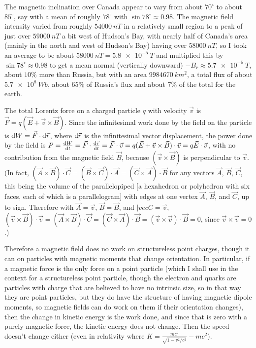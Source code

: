 The magnetic inclination over Canada appear to vary from about $70^\circ$ to about $85^\circ$, say with a mean of roughly $78^\circ$ with $\sin78^\circ \approx 0.98$. The magnetic field intensity varied from roughly $\SI{54000}{nT}$ in a relatively small region to a peak of just over $\SI{59000}{nT}$ a bit west of Hudson's Bay, with nearly half of Canada's area (mainly in the north and west of Hudson's Bay) having over $\SI{58000}{nT}$, so I took an average to be about $\SI{58000}{nT} = \SI{5.8e-5}{T}$ and multiplied this by $\sin78^\circ \approx 0.98$ to get a mean normal (vertically downward) $-B_r \approx \SI{5.7e-5}{T}$, about $10\%$ more than Russia, but with an area $\SI{9984670}{km^2}$, a total flux of about $\SI{5.7e8}{Wb}$, about $65\%$ of Russia's flux and about $7\%$ of the total for the earth.

The total Lorentz force on a charged particle $q$ with velocity $\vec{v}$ is $\vec{F} = q(\vec{E} + \vec{v}\times\vec{B})$. Since the infinitesimal work done by the field on the particle is $\operatorname{d\!} W = \vec{F}\cdot \operatorname{d\!} \vec{r}$, where $\operatorname{d\!} \vec{r}$ is the infinitesimal vector displacement, the power done by the field is $P = \frac{\operatorname{d\!} W}{\operatorname{d\!} t} = \vec{F}\cdot \frac{\operatorname{d\!} \vec{r}}{\operatorname{d\!} t} = \vec{F}\cdot \vec{v} = q(\vec{E} + \vec{v}\times\vec{B}) \cdot \vec{v} = q\vec{E}\cdot\vec{v}$, with no contribution from the magnetic field $\vec{B}$, because $(\vec{v} \times \vec{B})$ is perpendicular to $\vec{v}$. (In fact, $(\vec{A}\times\vec{B})\cdot\vec{C} = (\vec{B}\times\vec{C})\cdot\vec{A} = (\vec{C}\times\vec{A})\cdot\vec{B}$ for any vectors $\vec{A}$, $\vec{B}$, $\vec{C}$, this being the volume of the parallelopiped [a hexahedron or polyhedron with six faces, each of which is a parallelogram] with edges at one vertex $\vec{A}$, $\vec{B}$, and $\vec{C}$, up to sign. Therefore with $\vec{A} = \vec{v}$, $\vec{B} = \vec{B}$, and $|vec{C} = \vec{v}$, $(\vec{v}\times\vec{B})\cdot\vec{v} = (\vec{A}\times\vec{B})\cdot\vec{C} = (\vec{C}\times\vec{A})\cdot\vec{B} = (\vec{v}\times\vec{v})\cdot\vec{B} = 0$, since $\vec{v}\times\vec{v} = 0$.)

Therefore a magnetic field does no work on structureless point charges, though it can on particles with magnetic moments that change orientation. In particular, if a magnetic force is the only force on a point particle (which I shall use in the context for a structureless point particle, though the electron and quarks are particles with charge that are believed to have no intrinsic size, so in that way they are point particles, but they do have the structure of having magnetic dipole moments, so magnetic fields can do work on them if their orientation changes), then the change in kinetic energy is the work done, and since that is zero with a purely magnetic force, the kinetic energy does not change. Then the speed doesn't change either (even in relativity where $K = \frac{mc^2}{\sqrt{ 1-v^2/c^2 }} - mc^2$).

